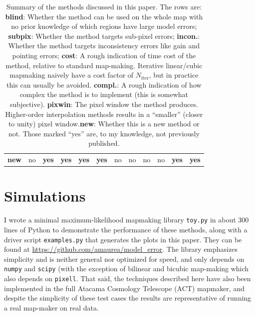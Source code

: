 \documentclass{article}
\newcommand{\code}[1]{\texttt{#1}}
\newcommand{\mixed}[1]{{\color{blue}\textbf{#1}}}
\newcommand{\neutral}[1]{#1}
\newcommand{\dfn}[1]{\textbf{#1}}
\begin{document}
\begin{table}
\begin{tabular}{cccccccccccc}
		\\
			\bf new &
			\neutral{no} &
			\mixed{yes} &
			\mixed{yes} &
			\mixed{yes} &
			\mixed{yes} &
			\neutral{no} &
			\neutral{no} &
			\neutral{no} &
			\neutral{no} &
			\mixed{yes} &
			\mixed{yes}
	\end{tabular}
	\caption{Summary of the methods discussed in this paper. The rows are: \dfn{blind}: Whether
		the method can be used on the whole map with no prior knowledge of which regions have
		large model errors; \dfn{subpix}: Whether the method targets sub-pixel errors;
		\dfn{incon.}: Whether the method targets inconsistency errors like gain and pointing
		errors; \dfn{cost}: A rough indication of time cost of the method, relative to
		standard map-making. Iterative linear/cubic mapmaking naively have a cost factor of
		$N_\textrm{iter}$, but in practice this can usually be avoided. \dfn{compl.}:
		A rough indication of how complex the method is to implement (this is somewhat subjective).
		\dfn{pixwin}:
		The pixel window the method produces. Higher-order interpolation methods results in
		a ``smaller'' (closer to unity) pixel window.\dfn{new}: Whether this is a new
		method or not. Those marked ``yes'' are, to my knowledge, not previously published.}
	\label{tab:summary}
\end{table}

\section{Simulations}
I wrote a minimal maximum-likelihood
mapmaking library \code{toy.py} in about 300 lines of Python to demonstrate the performance of these
methods, along with a driver script \code{examples.py}
that generates the plots in this paper. They can be found at \url{https://github.com/amaurea/model_error}.
The library emphasizes simplicity and is neither general
nor optimized for speed, and only depends on \code{numpy} and \code{scipy} (with
the exception of bilinear and bicubic map-making which also depends on \code{pixell}.
That said, the techniques described here have also been implemented in
the full Atacama Cosmology Telescope (ACT) mapmaker, and despite the simplicity of these test cases
the results are representative of running a real map-maker on real data.
\end{document}
